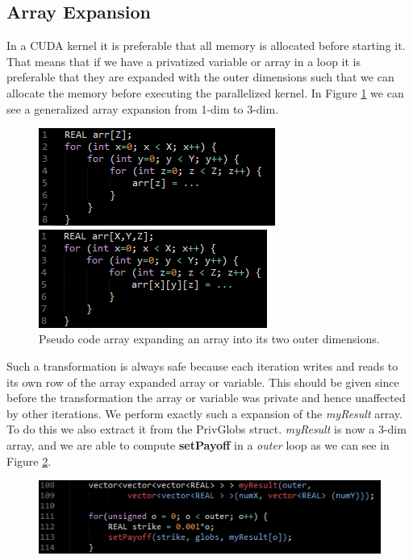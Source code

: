\subsection{Array Expansion}
In a CUDA kernel it is preferable that all memory is allocated before
starting it. That means that if we have a privatized variable or array in a loop
it is preferable that they are expanded with the outer dimensions such that we
can allocate the memory before executing the parallelized kernel.
In Figure \ref{fig:arr_exp} we can see a generalized array expansion from 1-dim
to 3-dim.

\begin{figure}[!ht]
    \centering
    \begin{minipage}{0.49\linewidth}
        \centering
		\includegraphics[scale=0.7]{input/figures/arr_exp1.png}
    \end{minipage}
    \begin{minipage}{0.49\linewidth}
        \centering
		\includegraphics[scale=0.7]{input/figures/arr_exp2.png}
    \end{minipage}
\caption{Pseudo code array expanding an array into its two outer dimensions.\label{fig:arr_exp}}
\end{figure}

Such a transformation is always safe because each iteration writes and reads to its own
row of the array expanded array or variable. This should be given since before
the transformation the array or variable was private and hence unaffected by
other iterations.
We perform exactly such a expansion of the \emph{myResult} array. To do this we
also extract it from the PrivGlobs struct. \emph{myResult} is now a 3-dim
array, and we are able to compute \textbf{setPayoff} in a \emph{outer} loop as
we can see in Figure \ref{fig:new_myresult}.

\begin{figure}[!ht]
	\centering
		\includegraphics[scale=1]{input/figures/new_myResult.png}
		\caption{\label{fig:new_myresult}}
\end{figure}

